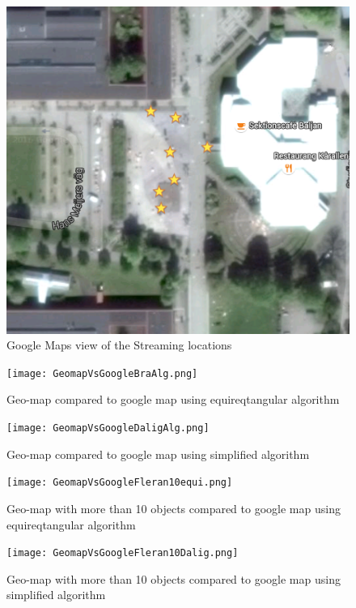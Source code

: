 \begin{figure}[ht!]
\begin{center}
	\includegraphics[scale=0.64]{Google_Maps.png}
	\caption{Google Maps view of the Streaming locations}
	\label{fig:googlemaps}
\end{center}
\end{figure}

\begin{figure}[!htb]
  \texttt{[image: GeomapVsGoogleBraAlg.png]}
  \caption{Geo-map compared to google map using equireqtangular algorithm}\label{fig:GeomapVsGoogleBraAlg}
\endminipage\hfill
\hspace{3px}
  \texttt{[image: GeomapVsGoogleDaligAlg.png]}
  \caption{Geo-map compared to google map using simplified algorithm}\label{fig:GeomapVsGoogleDaligAlg}
\endminipage\hfill
\end{figure}

\begin{figure}[!htb]
  \texttt{[image: GeomapVsGoogleFleran10equi.png]}
  \caption{Geo-map with more than 10 objects compared to google map using equireqtangular algorithm}\label{fig:GeomapVsGoogleFleran10equi}
\endminipage\hfill
\hspace{3px}
  \texttt{[image: GeomapVsGoogleFleran10Dalig.png]}
  \caption{Geo-map with more than 10 objects compared to google map using simplified algorithm}\label{fig:GeomapVsGoogleFleran10Dalig}
\endminipage\hfill
\end{figure}

